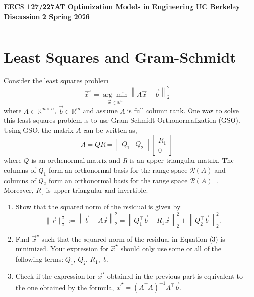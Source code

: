 \documentclass[10pt]{article}
\newcommand{\RR}{\mathbb{R}}
\newcommand{\Range}{\mathcal{R}}
\begin{document}
\begin{center}
    {\large\bfseries EECS 127/227AT \hfill Optimization Models in Engineering \hfill UC Berkeley}\\[4pt]
    {\large\bfseries Discussion 2 \hfill \hfill Spring 2026}
\end{center}

\noindent\rule{\textwidth}{0.4pt}

\section{Least Squares and Gram-Schmidt}

Consider the least squares problem
\begin{equation}
    \vec{x}^\star = \underset{\vec{x} \in \RR^n}{\arg\min} \left\| A\vec{x} - \vec{b} \right\|_2^2
\end{equation}
where $A \in \RR^{m \times n}$, $\vec{b} \in \RR^m$ and assume $A$ is full column rank. One way to solve this least-squares problem is to use Gram-Schmidt Orthonormalization (GSO). Using GSO, the matrix $A$ can be written as,
\begin{equation}
    A = QR = \begin{bmatrix} Q_1 & Q_2 \end{bmatrix} \begin{bmatrix} R_1 \\ 0 \end{bmatrix}
\end{equation}
where $Q$ is an orthonormal matrix and $R$ is an upper-triangular matrix. The columns of $Q_1$ form an orthonormal basis for the range space $\Range(A)$ and columns of $Q_2$ form an orthonormal basis for the range space $\Range(A)^\perp$. Moreover, $R_1$ is upper triangular and invertible.

\begin{enumerate}[label=(\alph*)]
    \item Show that the squared norm of the residual is given by
    \begin{equation}
        \|\vec{r}\|_2^2 := \left\| \vec{b} - A\vec{x} \right\|_2^2 = \left\| Q_1^\top \vec{b} - R_1 \vec{x} \right\|_2^2 + \left\| Q_2^\top \vec{b} \right\|_2^2.
    \end{equation}

    \vspace{4cm}

    \item Find $\vec{x}^\star$ such that the squared norm of the residual in Equation (3) is minimized. Your expression for $\vec{x}^\star$ should only use some or all of the following terms: $Q_1$, $Q_2$, $R_1$, $\vec{b}$.

    \vspace{4cm}

    \item Check if the expression for $\vec{x}^\star$ obtained in the previous part is equivalent to the one obtained by the formula,
    $\vec{x}^\star = (A^\top A)^{-1} A^\top \vec{b}$.

    \vspace{4cm}
\end{enumerate}
\end{document}
